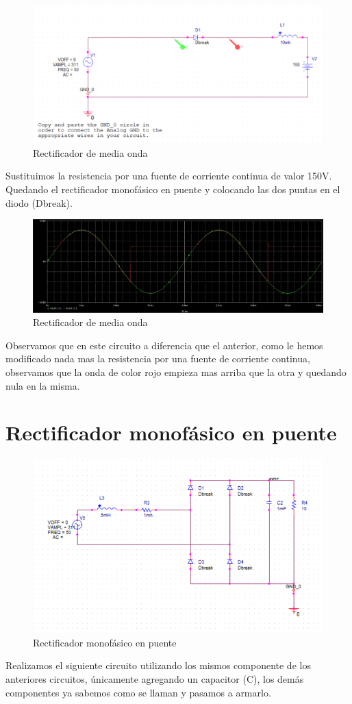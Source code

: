 \documentclass[12pt,a4paper]{article}
\begin{document}
\newpage
\begin{figure}[hbtp]
\includegraphics[scale=0.5]{3.png}
\caption{Rectificador de media onda}
\end{figure}
Sustituimos la resistencia por una fuente de corriente continua de valor 150V. Quedando el rectificador monofásico en puente y colocando las dos puntas en el diodo (Dbreak). 

\begin{figure}[hbtp]
\includegraphics[scale=0.35]{4.png}
\caption{Rectificador de media onda}
\end{figure}
Observamos que en este circuito a diferencia que el anterior, como le hemos modificado nada mas la resistencia por una fuente de corriente continua, observamos que la onda de color rojo empieza mas arriba que la otra y quedando nula en la misma. 

\newpage
\section{Rectificador monofásico en puente}
\begin{figure}[hbtp]
\centering
\includegraphics[scale=0.7]{5.png}
\caption{Rectificador monofásico en puente}
\end{figure}
Realizamos el siguiente circuito utilizando los mismos componente de los anteriores circuitos, únicamente agregando un capacitor (C), los demás componentes ya sabemos como se llaman y pasamos a armarlo. 
\end{document}
